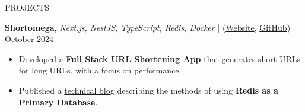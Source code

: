 \documentclass{resume} %
\begin{document}
\begin{rSection}{PROJECTS}
 \item \textbf{Shortomega}, \textit{Next.js, NestJS, TypeScript, Redis, Docker} | (\href{https://shortomega.vercel.app/} {Website}, \href{https://github.com/ninadnaik10/shortomega} {GitHub})  \hfill {October 2024}
    \begin{itemize}
        \setlength\itemsep{-0.6em}
        \item  Developed a \textbf{ Full Stack URL Shortening App} that generates short URLs for long URLs, with a focus on performance.
        \item  Published a \href{https://tech.ninadnaik.me/using-redis-as-a-primary-database}{technical blog} describing the methods of using \textbf{Redis as a Primary Database}.


\end{itemize}
\end{rSection}
\end{document}
